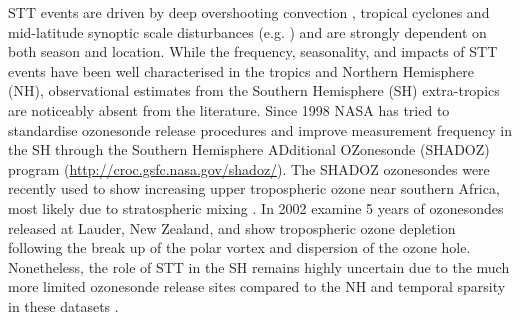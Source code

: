 STT events are driven by deep overshooting convection \citep{Frey2015}, tropical cyclones \citep{Das2016} and mid-latitude synoptic scale disturbances (e.g. \citet{Stohl2003, Mihalikova2012}) and are strongly dependent on both season and location. 
While the frequency, seasonality, and impacts of STT events have been well characterised in the tropics and Northern Hemisphere (NH), observational estimates from the Southern Hemisphere (SH) extra-tropics are noticeably absent from the literature. 
Since 1998 NASA has tried to standardise ozonesonde release procedures and improve measurement frequency in the SH through the Southern Hemisphere ADditional OZonesonde (SHADOZ) program (\url{http://croc.gsfc.nasa.gov/shadoz/}).
The SHADOZ ozonesondes were recently used to show increasing upper tropospheric ozone near southern Africa, most likely due to stratospheric mixing \citep{Liu2015, Thompson2014}.
In 2002 \citet{Brinksma2002} examine 5 years of ozonesondes released at Lauder, New Zealand, and show tropospheric ozone depletion following the break up of the polar vortex and dispersion of the ozone hole.
Nonetheless, the role of STT in the SH remains highly uncertain due to the much more limited ozonesonde release sites compared to the NH and temporal sparsity in these datasets  \citep{Liu2015, Thompson2014, Mze2010}. 




